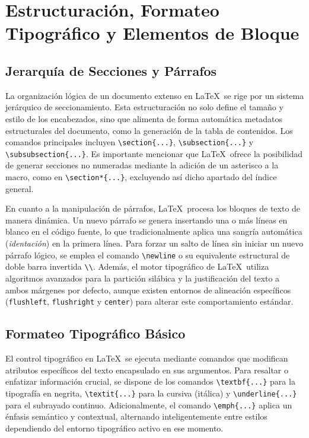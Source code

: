 \section{Estructuración, Formateo Tipográfico y Elementos de Bloque}

\subsection{Jerarquía de Secciones y Párrafos}
La organización lógica de un documento extenso en \LaTeX\ se rige por un sistema jerárquico de seccionamiento. Esta estructuración no solo define el tamaño y estilo de los encabezados, sino que alimenta de forma automática metadatos estructurales del documento, como la generación de la tabla de contenidos. Los comandos principales incluyen \texttt{\textbackslash section\{...\}}, \texttt{\textbackslash subsection\{...\}} y \texttt{\textbackslash subsubsection\{...\}}. Es importante mencionar que \LaTeX\ ofrece la posibilidad de generar secciones no numeradas mediante la adición de un asterisco a la macro, como en \texttt{\textbackslash section*\{...\}}, excluyendo así dicho apartado del índice general.

En cuanto a la manipulación de párrafos, \LaTeX\ procesa los bloques de texto de manera dinámica. Un nuevo párrafo se genera insertando una o más líneas en blanco en el código fuente, lo que tradicionalmente aplica una sangría automática (\textit{identación}) en la primera línea. Para forzar un salto de línea sin iniciar un nuevo párrafo lógico, se emplea el comando \texttt{\textbackslash newline} o su equivalente estructural de doble barra invertida \texttt{\textbackslash\textbackslash}. Además, el motor tipográfico de \LaTeX\ utiliza algoritmos avanzados para la partición silábica y la justificación del texto a ambos márgenes por defecto, aunque existen entornos de alineación específicos (\texttt{flushleft}, \texttt{flushright} y \texttt{center}) para alterar este comportamiento estándar.

\subsection{Formateo Tipográfico Básico}
El control tipográfico en \LaTeX\ se ejecuta mediante comandos que modifican atributos específicos del texto encapsulado en sus argumentos. Para resaltar o enfatizar información crucial, se dispone de los comandos \texttt{\textbackslash textbf\{...\}} para la tipografía en negrita, \texttt{\textbackslash textit\{...\}} para la cursiva (itálica) y \texttt{\textbackslash underline\{...\}} para el subrayado continuo. Adicionalmente, el comando \texttt{\textbackslash emph\{...\}} aplica un énfasis semántico y contextual, alternando inteligentemente entre estilos dependiendo del entorno tipográfico activo en ese momento.

